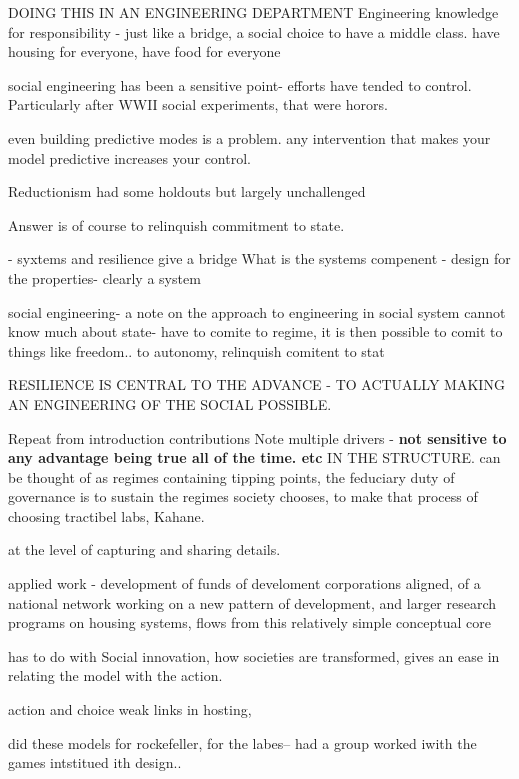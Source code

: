 DOING THIS IN AN ENGINEERING DEPARTMENT
Engineering  knowledge for responsibility - just like a bridge, a social choice to have a middle class.
have housing for everyone, have food for everyone

social engineering has been a sensitive point- efforts have tended to control.
Particularly after WWII social experiments, that were horors.

even building predictive modes is a problem. any intervention that makes your model predictive increases your control.

Reductionism had some holdouts but largely unchallenged


Answer is of course to relinquish commitment to state. 

- syxtems and resilience give  a bridge
What is the systems compenent - design for the properties- 
clearly a system

social engineering- a note on the approach to engineering in social system
cannot know much about state- have to comite to regime, it is then possible to comit to things like freedom..
to autonomy, relinquish comitent to stat


RESILIENCE IS CENTRAL TO THE ADVANCE - TO ACTUALLY MAKING AN ENGINEERING OF THE SOCIAL POSSIBLE.

Repeat from introduction contributions
Note multiple drivers - \textbf{not sensitive to any advantage being true all of the time. etc } IN THE STRUCTURE.
can be thought of as regimes containing tipping points, the feduciary duty of governance is to sustain the regimes society chooses, to make that process of choosing tractibel labs, Kahane.

at the level of capturing and sharing details.

applied work
- development of funds of develoment corporations aligned, of a national network working on a new pattern of development, and larger research programs on housing systems, flows from this relatively simple conceptual core

has to do with Social innovation, how societies are transformed,
gives an ease in relating the model with the action. 

action and choice
weak links in hosting, 

did these models for rockefeller, for the labes-- had a group
worked iwith the games intstitued ith design..



